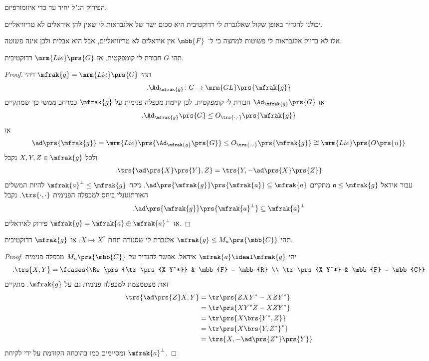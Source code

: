 \documentclass[10pt, twoside]{book}
\newcommand{\Lie}{\mrm{Lie}}
\begin{document}
\begin{fact}
הפירוק הנ"ל יחיד עד כדי איזומורפיזם.
\end{fact}

\begin{remark}
יכולנו להגדיר באופן שקול שאלגברת לי רדוקטיבית היא סכום ישר של אלגבראות לי שאין להן אידאלים לא טריוויאליים.

אלו לא בדיוק אלגבראות לי פשוטות למחצה כי ל־%
$\mbb{F}$
אין אידאלים לא טריוויאליים, אבל היא אבלית ולכן אינה פשוטה.
\end{remark}

\begin{proposition}
תהי
$G$
חבורת לי קומפקטית. אז
$\Lie\prs{G}$
רדוקטיבית.
\end{proposition}

\begin{proof}
תהי
$\mfrak{g} = \Lie\prs{G}$
ויהי
\[\text{.} \Ad_{\mfrak{g}} \colon G \to \mrm{GL}\prs{\mfrak{g}}\]
אז
$\Ad_{\mfrak{g}}\prs{G}$
חבורת לי קומפקטית.
לכן קיימת מכפלה פנימית על
$\mfrak{g}$
כמרחב ממשי כך שמתקיים
\[\text{.} \Ad_{\mfrak{g}}\prs{G} \leq O_{\trs{\cdot,\cdot}}\prs{\mfrak{g}}\]
אז
\begin{align*}
\ad\prs{\mfrak{g}} = \Lie\prs{\Ad_{\mfrak{g}}\prs{G}} \leq O_{\trs{\cdot,\cdot}}\prs{\mfrak{g}} \cong \Lie\prs{O\prs{n}}
\end{align*}
ולכל
$X,Y,Z \in \mfrak{g}$
נקבל
\begin{align*}
\text{.} \trs{\ad\prs{X}\prs{Y}, Z} = \trs{Y, -\ad\prs{X}\prs{Z}}
\end{align*}
עבור אידאל
$\frak{a} \leq \mfrak{g}$
מתקיים
$\ad\prs{\mfrak{g}}\prs{\mfrak{a}} \subseteq \mfrak{a}$.
ניקח
$\mfrak{a}^\perp \leq \mfrak{g}$
להיות המשלים האורתוגונלי ביחס למכפלה הפנימית
$\trs{\cdot,\cdot}$.
נקבל
\[\text{.} \ad\prs{\mfrak{g}}\prs{\mfrak{a}^{\perp}} \subseteq \mfrak{a}^\perp\]
אז
$\mfrak{g} = \mfrak{a} \oplus \mfrak{a}^\perp$
פירוק לאידאלים.
\end{proof}

\begin{proposition}
תהי
$\mfrak{g} \leq M_n\prs{\mbb{C}}$
אלגברת לי שסגורה תחת
$X \mapsto X^*$.
אז
$\mfrak{g}$
רדוקטיבית.
\end{proposition}

\begin{proof}
יהי
$\mfrak{a} \ideal \mfrak{g}$
אידאל.
אפשר להגדיר על
$M_n\prs{\mbb{C}}$
מכפלה פנימית
\[\text{.} \trs{X,Y} = \fcases{\Re\prs{\tr\prs{X Y^*}} & \mbb{F} = \mbb{R} \\ \tr\prs{X Y^*} & \mbb{F} = \mbb{C}}\]
זאת מצטמצמת למכפלה פנימית גם על
$\mfrak{g}$.
מתקיים
\begin{align*}
\trs{\ad\prs{Z} X, Y} &= \tr\prs{ZXY^* - XZY^*}
\\&= \tr\prs{XY^*Z - XZY^*}
\\&= \tr\prs{X \brs{Y^*, Z}}
\\&= \tr\prs{X \brs{Y,Z^*}^*}
\\&= \trs{X, -\ad\prs{Z^*}\prs{Y}}
\end{align*}
ומסיימים כמו בהוכחה הקודמת על ידי לקיחת
$\mfrak{a}^\perp$.
\end{proof}
\end{document}
